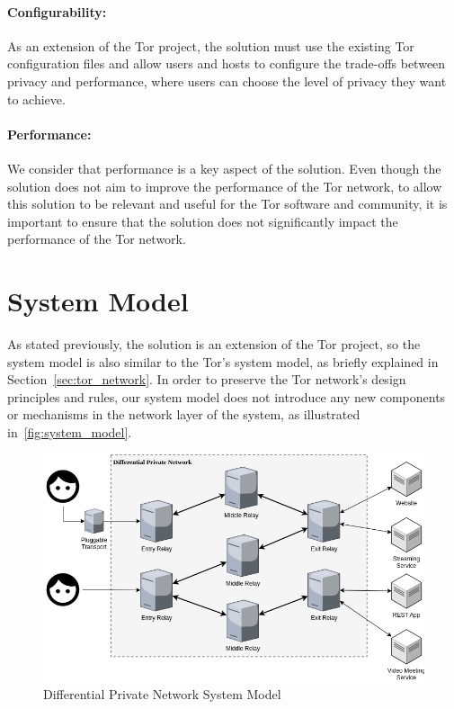 \paragraph{Configurability:} As an extension of the Tor project, the solution must use the existing Tor configuration files and allow users and hosts to configure the trade-offs between privacy and performance, where users can choose the level of privacy they want to achieve.
\paragraph{Performance:} We consider that performance is a key aspect of the solution. Even though the solution does not aim to improve the performance of the Tor network, to allow this solution to be relevant and useful for the Tor software and community, it is important to ensure that the solution does not significantly impact the performance of the Tor network. 


\section{System Model}\label{sec:system_model}

As stated previously, the solution is an extension of the Tor project, so the system model is also similar to the Tor's system model, as briefly explained in Section~\ref{sec:tor_network}. In order to preserve the Tor network's design principles and rules, our system model does not introduce any new components or mechanisms in the network layer of the system, as illustrated in~\autoref{fig:system_model}. 

\begin{figure}[!h]
  \centering
  \includegraphics[width=\textwidth]{Chapters/Figures/System_Model_Geral.png}
  \caption{Differential Private Network System Model}\label{fig:system_model}
\end{figure}

